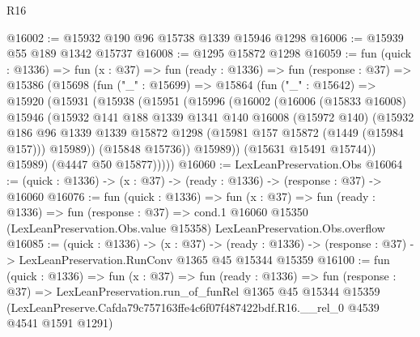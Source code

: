 \begin{lexlean}{R16}
\begin{coremodule}
@16002 := @15932 @190 @96 @15738 @1339 @15946 @1298
@16006 := @15939 @55 @189 @1342 @15737
@16008 := @1295 @15872 @1298
@16059 := fun (quick : @1336) =>
  fun (x : @37) =>
  fun (ready : @1336) =>
  fun (response : @37) =>
  @15386
    (@15698
      (fun ("_" : @15699) =>
      @15864
        (fun ("_" : @15642) =>
        @15920
          (@15931
            (@15938
              (@15951
                (@15996
                  (@16002
                    (@16006
                      (@15833 @16008)
                      @15946
                      (@15932
                        @141
                        @188
                        @1339
                        @1341
                        @140
                        @16008
                        (@15972 @140)
                        (@15932
                          @186
                          @96
                          @1339
                          @1339
                          @15872
                          @1298
                          (@15981 @157 @15872 (@1449 (@15984 @157)))
                          @15989))
                      (@15848 @15736))
                    @15989))
                (@15631 @15491 @15744))
              @15989)
            (@4447 @50 @15877)))))
@16060 := LexLeanPreservation.Obs
@16064 := (quick : @1336) -> (x : @37) -> (ready : @1336) -> (response : @37) -> @16060
@16076 := fun (quick : @1336) =>
  fun (x : @37) =>
  fun (ready : @1336) =>
  fun (response : @37) =>
  cond.{1} @16060 @15350 (LexLeanPreservation.Obs.value @15358) LexLeanPreservation.Obs.overflow
@16085 := (quick : @1336) ->
  (x : @37) ->
  (ready : @1336) -> (response : @37) -> LexLeanPreservation.RunConv @1365 @45 @15344 @15359
@16100 := fun (quick : @1336) =>
  fun (x : @37) =>
  fun (ready : @1336) =>
  fun (response : @37) =>
  LexLeanPreservation.run_of_funRel
    @1365
    @45
    @15344
    @15359
    (LexLeanPreserve.Cafda79c757163ffe4c6f07f487422bdf.R16.__rel_0 @4539 @4541 @1591 @1291)
\end{coremodule}
\end{lexlean}
